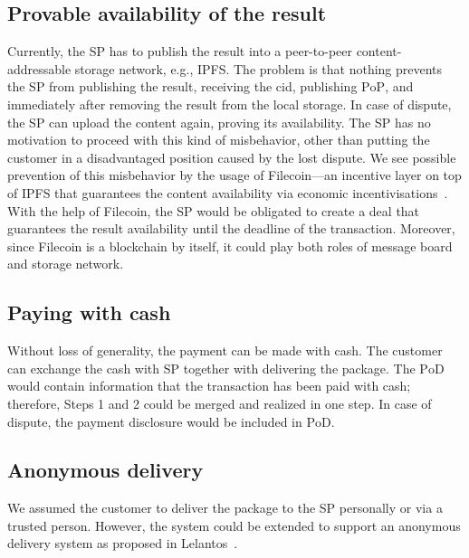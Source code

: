 \documentclass{ieeeaccess}
\begin{document}
\subsection{Provable availability of the
result}\label{cryptographically-provable-availability-of-results}

Currently, the SP has to publish the result into a peer-to-peer content-addressable storage network, e.g., IPFS. The problem is that nothing prevents the SP from publishing the result, receiving the cid, publishing $\mathrm{PoP}$, and immediately after removing the result from the local storage. In case of dispute, the SP can upload the content again, proving its availability. The SP has no motivation to proceed with this kind of misbehavior, other than putting the customer in a disadvantaged position caused by the lost dispute. We see possible prevention of this misbehavior by the usage of Filecoin---an incentive layer on top of IPFS that guarantees the content availability via economic incentivisations~\cite{benetfilecoin}. With the help of Filecoin, the SP would be obligated to create a deal that guarantees the result availability until the deadline of the transaction. Moreover, since Filecoin is a blockchain by itself, it could play both roles of message board and storage network.

\subsection{Paying with cash}\label{paying-with-cash}

Without loss of generality, the payment can be made with cash. The customer can exchange the cash with SP together with delivering the package. The $\mathrm{PoD}$ would contain information that the transaction has been paid with cash; therefore, Steps 1 and 2 could be merged and realized in one step. In case of dispute, the payment disclosure would be included in $\mathrm{PoD}$.

\subsection{Anonymous delivery}\label{anonymous-delivery}

We assumed the customer to deliver the package to the SP personally or via a trusted person. However, the system could be extended to support an anonymous delivery system as proposed in Lelantos~\cite{altawy2017lelantos}.
\end{document}
